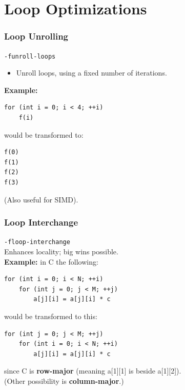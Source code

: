 \documentclass[aspectratio=43]{beamer}
\newenvironment{changemargin}[1]{%
  \begin{list}{}{%
    \setlength{\topsep}{0pt}%
    \setlength{\leftmargin}{#1}%
    \setlength{\rightmargin}{1em}
    \setlength{\listparindent}{\parindent}%
    \setlength{\itemindent}{\parindent}%
    \setlength{\parsep}{\parskip}%
  }%
  \item[]}{\end{list}}
\begin{document}
\section{Loop Optimizations}
\begin{frame}[fragile]
  \frametitle{Loop Unrolling}

  \begin{changemargin}{2cm}
  {\tt -funroll-loops}
  \begin{itemize}
    \item Unroll loops, using a fixed number of iterations.
  \end{itemize}
  \vfill
  {\bf Example:}

  \begin{lstlisting}
for (int i = 0; i < 4; ++i)
    f(i)
  \end{lstlisting}

would be transformed to:

  \begin{lstlisting}
f(0)
f(1)
f(2)
f(3)
  \end{lstlisting}
(Also useful for SIMD).
  \end{changemargin}
\end{frame}

\begin{frame}[fragile]
  \frametitle{Loop Interchange}

  \begin{changemargin}{2cm}
  {\tt -floop-interchange}\\
  Enhances locality; big wins possible.\\[1em]

  {\bf Example:} in C the following:
  \begin{lstlisting}
for (int i = 0; i < N; ++i)
    for (int j = 0; j < M; ++j)
        a[j][i] = a[j][i] * c
  \end{lstlisting}
  would be transformed to this:
  \begin{lstlisting}
for (int j = 0; j < M; ++j)
    for (int i = 0; i < N; ++i)
        a[j][i] = a[j][i] * c
  \end{lstlisting}
  since C is {\bf row-major} (meaning a[1][1] is beside a[1][2]).\\
  (Other
  possibility is {\bf column-major}.)
  \end{changemargin}
\end{frame}
\end{document}
